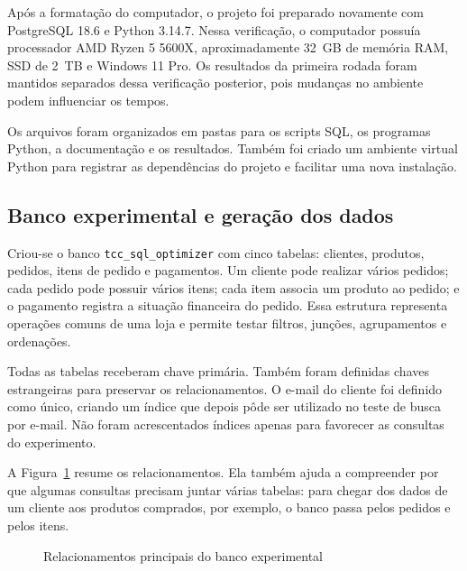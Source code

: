 Após a formatação do computador, o projeto foi preparado novamente com PostgreSQL 18.6 e Python 3.14.7. Nessa verificação, o computador possuía processador AMD Ryzen 5 5600X, aproximadamente 32~GB de memória RAM, SSD de 2~TB e Windows 11 Pro. Os resultados da primeira rodada foram mantidos separados dessa verificação posterior, pois mudanças no ambiente podem influenciar os tempos.

Os arquivos foram organizados em pastas para os scripts SQL, os programas Python, a documentação e os resultados. Também foi criado um ambiente virtual Python para registrar as dependências do projeto e facilitar uma nova instalação.

\subsection{Banco experimental e geração dos dados}

Criou-se o banco \texttt{tcc\_sql\_optimizer} com cinco tabelas: clientes, produtos, pedidos, itens de pedido e pagamentos. Um cliente pode realizar vários pedidos; cada pedido pode possuir vários itens; cada item associa um produto ao pedido; e o pagamento registra a situação financeira do pedido. Essa estrutura representa operações comuns de uma loja e permite testar filtros, junções, agrupamentos e ordenações.

Todas as tabelas receberam chave primária. Também foram definidas chaves estrangeiras para preservar os relacionamentos. O e-mail do cliente foi definido como único, criando um índice que depois pôde ser utilizado no teste de busca por e-mail. Não foram acrescentados índices apenas para favorecer as consultas do experimento.

A Figura~\ref{fig:modelo-simples} resume os relacionamentos. Ela também ajuda a compreender por que algumas consultas precisam juntar várias tabelas: para chegar dos dados de um cliente aos produtos comprados, por exemplo, o banco passa pelos pedidos e pelos itens.

\begin{figure}[H]
\centering
\caption{Relacionamentos principais do banco experimental}
\label{fig:modelo-simples}
\fonteautor
\end{figure}

